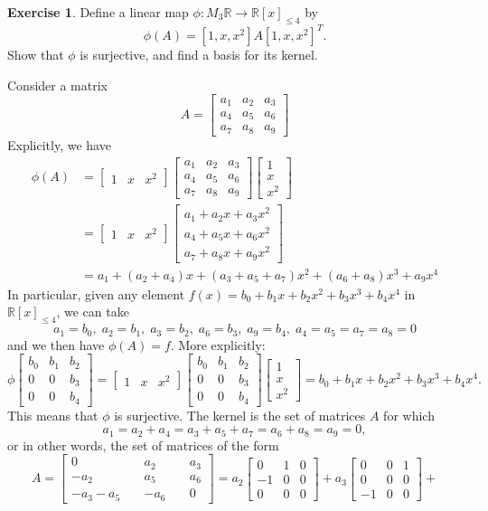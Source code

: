\documentclass{amsart}
\newcommand{\R}         {{\mathbb{R}}}
\newcommand{\bbm}       {\left[\begin{matrix}}
\newcommand{\ebm}       {\end{matrix}\right]}
\newcommand{\bsm}       {\left[\begin{smallmatrix}}
\newcommand{\esm}       {\end{smallmatrix}\right]}
\renewcommand{\:}       {\colon}
\theoremstyle{definition}
\newtheorem{exercise}{Exercise}[section]
\renewenvironment{solution}{\SolutionAtEnd}{\endSolutionAtEnd}
\begin{document}
\begin{exercise}
 Define a linear map $\phi\:M_3\R\to\R[x]_{\leq 4}$ by
 \[ \phi(A) = [1,x,x^2] A [1,x,x^2]^T. \]
 Show that $\phi$ is surjective, and find a basis for its kernel.
\end{exercise}
\begin{solution}
 Consider a matrix
 \[ A = \bbm a_1&a_2&a_3\\ a_4&a_5&a_6 \\ a_7&a_8&a_9 \ebm \]
 Explicitly, we have
 \begin{align*}
  \phi(A)
  &= \bbm 1 & x & x^2\ebm
     \bbm a_1&a_2&a_3\\ a_4&a_5&a_6 \\ a_7&a_8&a_9 \ebm
     \bbm 1 \\ x \\ x^2\ebm \\
  &= \bbm 1 & x & x^2 \ebm
     \bbm a_1 + a_2x + a_3 x^2 \\
          a_4 + a_5x + a_6 x^2 \\
          a_7 + a_8x + a_9 x^2 \ebm \\
  &= a_1 + (a_2+a_4)x + (a_3+a_5+a_7)x^2 + (a_6+a_8)x^3 + a_9x^4
 \end{align*}
 In particular, given any element $f(x)=b_0+b_1x+b_2x^2+b_3x^3+b_4x^4$ in
 $\R[x]_{\leq 4}$, we can take
 \[ a_1=b_0,\; a_2=b_1,\; a_3=b_2,\; a_6=b_3,\; a_9=b_4,\;
    a_4=a_5=a_7=a_8=0
 \]
 and we then have $\phi(A)=f$.  More explicitly:
 \[ \phi\bsm b_0 & b_1 & b_2 \\ 0 & 0 & b_3 \\ 0 & 0 & b_4 \esm 
    = \bbm 1 & x & x^2\ebm 
      \bsm b_0 & b_1 & b_2 \\ 0 & 0 & b_3 \\ 0 & 0 & b_4 \esm 
      \bbm 1 \\ x \\ x^2 \ebm 
    = b_0 + b_1 x + b_2 x^2 + b_3 x^3 + b_4 x^4.
 \] 
 This means that $\phi$ is
 surjective.  The kernel is the set of matrices $A$ for which
 \[ a_1 = a_2+a_4 = a_3+a_5+a_7 = a_6+a_8 = a_9 = 0, \]
 or in other words, the set of matrices of the form
 {\tiny \[ A = \bsm 0 &\; & a_2 &\; & a_3 \\
             -a_2 &\; & a_5 &\; & a_6 \\
             -a_3-a_5 &\; & -a_6 &\; & 0 \esm = 
   a_2 \bbm  0&1&0\\ -1&0&0\\ 0&0&0 \ebm + 
   a_3 \bbm 0&0&1\\ 0&0&0\\ -1&0&0 \ebm + 
\]}
\end{solution}
\end{document}
